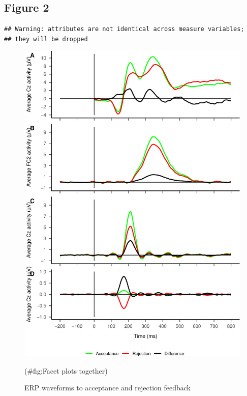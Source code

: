 \documentclass[english,man,floatsintext]{apa6}
\begin{document}
\hypertarget{figure-2}{%
\subsection{Figure 2}\label{figure-2}}

\begin{verbatim}
## Warning: attributes are not identical across measure variables;
## they will be dropped
\end{verbatim}

\begin{figure}

{\centering \includegraphics[width=1\linewidth]{DISS_tablesfigures_files/figure-latex/Facet plots together-1} 

}

\caption{ERP waveforms to acceptance and rejection feedback}(\#fig:Facet plots together)
\end{figure}
\end{document}
